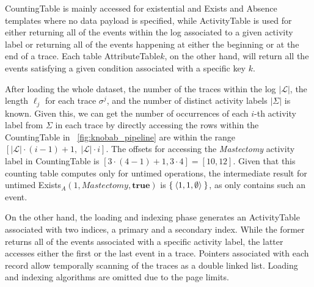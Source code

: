 \textsf{CountingTable} is mainly accessed for existential and \textsf{Exists} and \textsf{Absence} templates where no data payload is specified, while  \textsf{ActivityTable} is  used for either returning all of the events within the log associated to a given activity label or returning all of the events happening at either the beginning or at the end of a trace. Each table \textsf{AttributeTable$k$}, on the other hand, will 
return all the events satisfying a given condition associated with a specific %
key $k$. 

After loading the whole dataset, the number of the traces within the log $|\mathcal{L}|$, the length $\ell_j$ for each trace $\sigma^j$, and the number of distinct activity labels $|\Sigma|$ is known. Given this, we can get the number of occurrences of each $i$-th activity label from $\Sigma$ in each trace by directly accessing the rows within the \textsf{CountingTable} in \figurename~\ref{fig:knobab_pipeline} are within the range $[|\mathcal{L}|\cdot (i-1) + 1,\; |\mathcal{L}|\cdot i]$. The offsets for accessing the \textit{Mastectomy} activity label in \textsf{CountingTable} is $[3 \cdot (4-1) + 1, 3 \cdot 4] = [10,12]$. Given that this counting table computes only for untimed operations, the intermediate result for untimed \textsf{Exists}$_A(1,\textit{Mastectomy},\textbf{true})$ is $\Set{\braket{1,1,\emptyset}}$, as only  contains such an event.

On the other hand, the loading and indexing phase generates an \textsf{ActivityTable} associated with two indices, a primary and a secondary index. While the former returns all of the events associated with a specific activity label, the latter accesses either the first or the last event in a trace. Pointers associated with each record allow temporally scanning of the traces as a double linked list. 
Loading and indexing algorithms are omitted due to the page limits.



